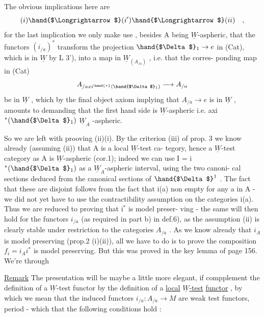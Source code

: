 
The obvious implications here are
\[ (i)\hand{$\Longrightarrow$}(i')\hand{$\Longrightarrow$}(ii) \quad , \]
for the last implication we only make use , besides A being $\underline{W}$-aspheric,
that the functors $(i_{/a})^*$ transform the projection $\hand{$\Delta$}_1 \to e$ in (Cat),
which is in $\underline{W}$ by L 3'), into a map in $\underline{W}_{(A_{/a})}$ , i.e. that the corres-%
ponding map in (Cat)
\[ A_{/axi^{\hand{*}}(\hand{$\Delta$}_1)} \longrightarrow A_{/a} \]
be in $\underline{W}$ , which by the final object axiom implying that $A_{/a}\to e$ is in
$\underline{W}$ , amounts to demanding that the first hand side is $\underline{W}$-aspheric i.e.
axi$^*(\hand{$\Delta$}_1)$ $\underline{W}_A$ -aspheric.

So we are left with prooving (ii)\hand{$\Rightarrow$}(i). By the criterion (iii)
of prop. 3 we know already (assuming (ii)) that A is a local $\underline{W}$-test ca-%
tegory, hence a $\underline{W}$-test category as A is $\underline{W}$-aspheric (cor.1); indeed
we can use I = i$^*(\hand{$\Delta$}_1)$ as a $\underline{W}_A$-aspheric interval, using the two canoni-%
cal sections deduced from the canonical sections of $\hand{$\Delta$}^1$ . The fact that
these are disjoint follows from the fact that i(a) non empty for any a in
A - we did not yet have to use the contractibility assumption on the
categories i(a). Thus we are reduced to proving that i$^*$ is model preser-%
ving - the same will then hold for the functors $i_{/a}$ (as required in
part b) in def.6), as the assumption (ii) is clearly stable under 
restriction to the categories $A_{/a}$ . As we know already that $i_A$ is
model preserving (prop.2 (i)\hand{$\Rightarrow$}(ii)), all we have to do is to prove the
composition $f_i = i_A i^*$ is model preserving. But this was proved  in the
key lemma of page 156. We're through \unsure{!}

\uline{Remark} The presentation will be maybe a little more elegant, if 
compplement the definition of a $\underline{W}$-test functor by the definition of a
\uline{local} \uline{$\underline{W}$-test} \uline{functor} , by which we mean that the induced functors
$i_{/a} : A_{/a} \longrightarrow M$ are weak test functors, period - which  
 that the following conditions hold :

